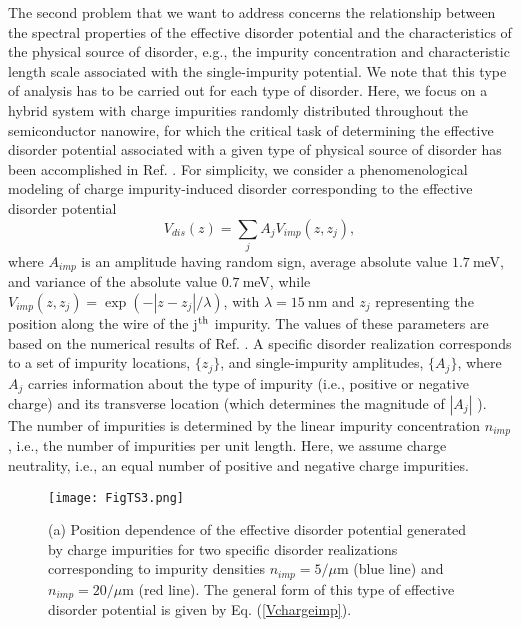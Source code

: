 \documentclass[aps,prmaterials,twocolumn,superscriptaddress,longbibliography]{revtex4-2}
\begin{document}
The second problem that we want to address concerns the relationship between the spectral properties of the effective disorder potential and the characteristics of the physical source of disorder, e.g., the impurity concentration and characteristic length scale associated with the single-impurity potential. We note that this type of analysis has to be carried out for each type of disorder. Here, we focus on a hybrid system with charge impurities randomly distributed throughout the semiconductor nanowire,  for which the critical task of determining the effective disorder potential associated with a given type of physical source of disorder has been accomplished in Ref. .  
For simplicity, we consider a phenomenological modeling of charge impurity-induced disorder corresponding to the effective disorder potential \cite{woods2021charge}
\begin{equation}
V_{dis}(z) = \sum_{j} A_j V_{imp}(z, z_j),  \label{Vchargeimp}
\end{equation}
where $A_{imp}$ is an amplitude having random sign, average absolute value $1.7~$meV, and variance of the absolute value $0.7~$meV, while $V_{imp}(z, z_j) = \exp(-|z-z_j|/\lambda)$, with $\lambda = 15~$nm and $z_j$  representing the position along the wire of the j$^{\rm th}$ impurity. The values of these parameters are based on the numerical results of Ref. . A specific disorder realization corresponds to a set of impurity locations, $\{z_j\}$, and single-impurity amplitudes, $\{A_j\}$, where  $A_j$ carries information about the type of impurity (i.e., positive or negative charge) and its transverse location (which determines the magnitude of  $|A_j|$ \cite{woods2021charge}). The number of impurities is determined by the linear impurity concentration $n_{imp}$, i.e., the number of impurities per unit length. Here, we assume charge neutrality, i.e.,  an equal number of positive and negative charge impurities. 

\begin{figure}[t]
\begin{center}
\texttt{[image: FigTS3.png]}
\end{center}
\vspace{-3mm}
\caption{(a) Position dependence of the effective disorder potential generated by charge impurities  for  two specific disorder realizations corresponding to impurity densities $n_{imp}=5/\mu$m (blue line) and  $n_{imp}=20/\mu$m (red line). The general form of this type of effective disorder potential is given by Eq. (\ref{Vchargeimp}).}
\label{FigTS3}
\vspace{-1mm}
\end{figure}
\end{document}
